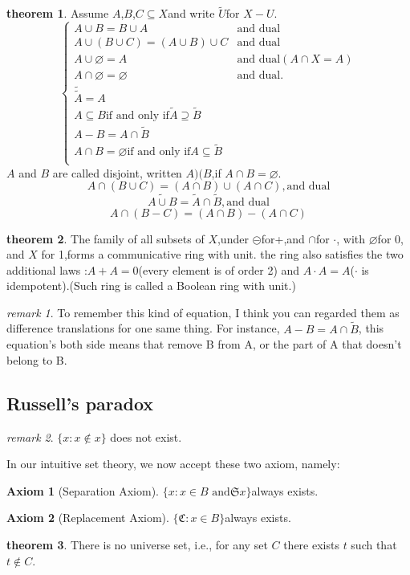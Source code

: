 \documentclass[a4paper,11pt]{article}%
\theoremstyle{remark}
\newtheorem*{remark}{remark}
\theoremstyle{definition}
\newtheorem{theorem}{theorem}[section]
\theoremstyle{definition}
\theoremstyle{plain}
\theoremstyle{definition}
\newtheorem{axiom}{Axiom}
\begin{document}
\begin{theorem}
    Assume $A$,$B$,$C\subseteq X$and write $\tilde{U}$for $X-U$.
\[
\begin{cases}
    A \cup B = B \cup A & \text{and dual}\\
    A \cup (B \cup C)=(A\cup B)\cup C& \text{and dual}\\
    A \cup \varnothing =A & \text{and dual}(A\cap X =A)\\
    A \cap \varnothing=\varnothing& \text{and dual}.\\
    \tilde{\tilde{A}}=A & \\
    A \subseteq B \text{if and only if} \tilde{A}\supseteq \tilde{B}& \\
    A-B = A \cap \tilde{B}& \\
    A\cap B =\varnothing \text{if and only if} A \subseteq \tilde{B}& \\
\end{cases}    
\]
$A$ and  $B$ are called disjoint, written $A)(B$,if $A\cap B =\varnothing$.
\[A\cap(B\cup C)=(A\cap B)\cup (A\cap C),\text{and dual}\]
\[\widetilde{A\cup B}=\tilde{A}\cap \tilde{B},\text{and dual} \]
\[A\cap(B-C)=(A\cap B)-(A\cap C)\]
\end{theorem}
\begin{theorem}
    The family of all subsets of $X $,under $\circleddash$for+,and $\cap$for $\cdot$,
    with $\varnothing$for 0, and $X$ for 1,forms a communicative ring with unit.
    the ring also satisfies the two additional laws :$A+A=0$(every element is of order 2)
    and $A\cdot A=A$($\cdot$ is idempotent).(Such ring is called a Boolean ring with unit.)
\end{theorem}
\begin{remark}
    To remember this kind of equation, I think you can regarded them as difference translations
    for one same thing. For instance, $A-B=A\cap \tilde{B}$, this equation's both side 
    means that remove B from A, or the part of A that doesn't belong to B.
\end{remark}
\subsection{Russell's paradox}
\begin{remark}
    $\{x:x\notin x\}$ does not exist.
\end{remark}
In our intuitive set theory, we now accept these two axiom, namely:
\begin{axiom}[Separation Axiom]
   $ \{x:x\in B \text{ and}\mathfrak{S} x\}$always exists.
\end{axiom}
\begin{axiom}[Replacement Axiom]
    $\{\mathfrak{C} :x \in B\}$always exists.
\end{axiom}
\begin{theorem}
    There is no universe set, i.e., for any set $C$ there exists $t$ such that $t \notin C$.
\end{theorem}
\end{document}
